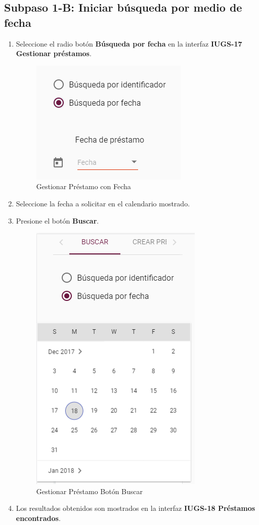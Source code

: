 \subsection{Subpaso 1-B: Iniciar búsqueda por medio de fecha}
\begin{enumerate}
	\item Seleccione el radio botón \textbf{Búsqueda por fecha} en la interfaz
		\textbf{IUGS-17 Gestionar préstamos}.
		\begin{figure}[hbtp]
	\includegraphics[scale=0.3]{images/InterfazMovil/IUGS07_gestionarPrestamoFecha.PNG}
	\caption{Gestionar Préstamo con Fecha}
	\end{figure}
	\item Seleccione la fecha a solicitar en el calendario mostrado.
	\item Presione el botón \textbf{Buscar}.
	\begin{figure}[hbtp]
	\includegraphics[scale=0.3]{images/InterfazMovil/IUGS07_gestionarPrestamoBuscar.PNG}
	\caption{Gestionar Préstamo Botón Buscar}
	\end{figure}
	\item Los resultados obtenidos son mostrados en la interfaz \textbf{IUGS-18 Préstamos encontrados}.
	\begin{figure}[hbtp]


\end{figure}
\end{enumerate}
